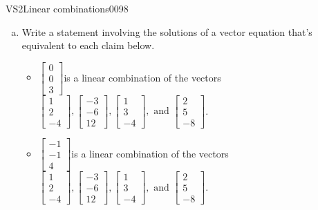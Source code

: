 \begin{exercise}{VS2}{Linear combinations}{0098} 
\begin{exerciseStatement} 

\begin{enumerate}[(a)]
\item  

 Write a statement involving the solutions of a vector equation that's equivalent to each claim below. 

 

\begin{itemize}
\item  

 \(\left[\begin{array}{c}
0 \\
0 \\
3
\end{array}\right]\)is a linear combination of the vectors \(\left[\begin{array}{c}
1 \\
2 \\
-4
\end{array}\right] , \left[\begin{array}{c}
-3 \\
-6 \\
12
\end{array}\right] , \left[\begin{array}{c}
1 \\
3 \\
-4
\end{array}\right] , \text{ and } \left[\begin{array}{c}
2 \\
5 \\
-8
\end{array}\right]\). 

 
\item  

 \(\left[\begin{array}{c}
-1 \\
-1 \\
4
\end{array}\right]\)is a linear combination of the vectors \(\left[\begin{array}{c}
1 \\
2 \\
-4
\end{array}\right] , \left[\begin{array}{c}
-3 \\
-6 \\
12
\end{array}\right] , \left[\begin{array}{c}
1 \\
3 \\
-4
\end{array}\right] , \text{ and } \left[\begin{array}{c}
2 \\
5 \\
-8
\end{array}\right]\). 


\end{itemize}
\end{enumerate}
\end{exerciseStatement}
\end{exercise}
